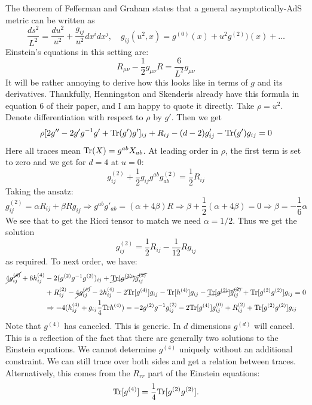 \documentclass[11pt, class=article, crop=false]{standalone}
\begin{document}
\begin{enumerate}
	 The theorem of Fefferman and Graham states that a general asymptotically-AdS metric can be written as
	\[
		\frac{ds^2}{L^2} = \frac{du^2}{u^2} + \frac{g_{ij}}{u^2} dx^i dx^j, \quad g_{ij}(u^2, x) = g^{(0)}(x) + u^2 g^{(2)})(x) + \dots
	\]
	Einstein's equations in this setting are:
	\[
		R_{\mu \nu} - \frac12 g_{\mu \nu} R = \frac{6}{L^2} g_{\mu \nu}
	\]
	It will be rather annoying to derive how this looks like in terms of $g$ and its derivatives. Thankfully, Henningston and Skenderis already have this formula in equation 6 of their paper, and I am happy to quote it directly. Take $\rho = u^2$. Denote differentiation with respect to $\rho$ by $g'$. Then we get 
	\begin{equation}\label{eq:fefferman-graham}
		\rho [2 g'' - 2 g' g^{-1} g' + \mathrm{Tr}(g') g']_{ij} + R_{ij} - (d-2) g'_{ij} - \mathrm{Tr}(g') g_{ij} = 0
	\end{equation}
	Here all traces mean $\mathrm{Tr}(X) = g^{ab} X_{ab}$. 
	At leading order in $\rho$, the first term is set to zero and we get for $d=4$ at $u = 0$:
	\[
		 g^{(2)}_{ij} + \frac12 g_{ij} g^{ab} g^{(2)}_{ab}  = \frac12 R_{ij}
	\]
	Taking the ansatz:
	\[
		g^{(2)}_{ij}  = \alpha R_{ij} + \beta R g_{ij} \Rightarrow g^{ab} g'_{ab} = (\alpha + 4 \beta) R \Rightarrow \beta +\frac12 (\alpha  + 4 \beta) = 0 \Rightarrow \beta = - \frac16 \alpha
	\]
	We see that to get the Ricci tensor to match we need $\alpha = 1/2$. Thus we get the solution
	\[
		g^{(2)}_{ij}  = \frac12 R_{ij} - \frac{1}{12} R g_{ij}
	\]
	as required. To next order, we have:
	\begin{equation}\label{eq:hard}
		\begin{aligned}
			\cancel{4 g^{(4)}_{ij}} + 6 h^{(4)}_{ij} & - 2 (g^{(2)} g^{-1} g^{(2)})_{ij} + \cancel{\mathrm{Tr}(g^{(2)}) g^{(2)}_{ij}} \\
			& + R_{ij}^{(2)} - \cancel{4 g^{(4)}_{ij}} - 2 h_{ij}^{(4)} - 2 \mathrm{Tr}[g^{(4)}] g_{ij} - \mathrm{Tr}[h^{(4)}] g_{ij}  - \cancel{\mathrm{Tr}[g^{(2)}] g_{ij}^{(2)}} + \mathrm{Tr}[g^{(2)} g^{(2)}] g_{ij} = 0\\
			&\Rightarrow -4 (h^{(4)}_{ij} + g_{ij} \frac14 \mathrm{Tr} h^{(4)}) = - 2 g^{(2)} g^{-1} g^{(2)}_{ij} - 2\mathrm{Tr}[g^{(4)}] g_{ij}^{(0)} + R_{ij}^{(2)}  + \mathrm{Tr}[g^{(2)} g^{(2)}] g_{ij}
		\end{aligned}
	\end{equation}
	Note that $g^{(4)}$ has canceled. This is generic. In $d$ dimensions $g^{(d)}$ will cancel. This is a reflection of the fact that there are generally two solutions to the Einstein equations. We cannot determine $g^{(4)}$ uniquely without an additional constraint. We can still trace over both sides and get a relation between traces. Alternatively, this comes from the $R_{rr}$ part of the Einstein equations:
	\[
		\Tr[g^{(4)}] =  \frac14 \Tr[g^{(2)} g^{(2)}].  %
	\]
	

\end{enumerate}
\end{document}
